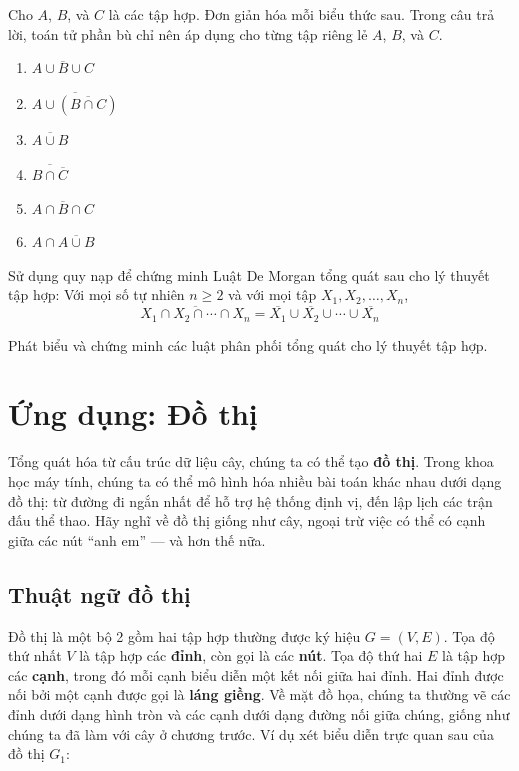 \begin{exercise}
Cho $A$, $B$, và $C$ là các tập hợp. Đơn giản hóa mỗi biểu thức sau. Trong câu trả lời, toán tử phần bù chỉ nên áp dụng cho từng tập riêng lẻ $A$, $B$, và $C$.
\begin{enumerate}[label=\alph*)]
\item $\overline{A \cup B \cup C}$
\item $\overline{A \cup (\overline{B \cap C})}$
\item $\overline{A \cup B}$
\item $\overline{B \cap \overline{C}}$
\item $\overline{A \cap B \cap C}$
\item $A \cap \overline{A \cup B}$
\end{enumerate}
\end{exercise}

\begin{exercise}
Sử dụng quy nạp để chứng minh Luật De Morgan tổng quát sau cho lý thuyết tập hợp: Với mọi số tự nhiên $n \geq 2$ và với mọi tập $X_1, X_2, \ldots, X_n$,
\[
\overline{X_1 \cap X_2 \cap \cdots \cap X_n} = \overline{X_1} \cup \overline{X_2} \cup \cdots \cup \overline{X_n}
\]
\end{exercise}

\begin{exercise}
Phát biểu và chứng minh các luật phân phối tổng quát cho lý thuyết tập hợp.
\end{exercise}


\section{Ứng dụng: Đồ thị}

Tổng quát hóa từ cấu trúc dữ liệu cây, chúng ta có thể tạo \textbf{đồ thị}. Trong khoa học máy tính, chúng ta có thể mô hình hóa nhiều bài toán khác nhau dưới dạng đồ thị: từ đường đi ngắn nhất để hỗ trợ hệ thống định vị, đến lập lịch các trận đấu thể thao. Hãy nghĩ về đồ thị giống như cây, ngoại trừ việc có thể có cạnh giữa các nút ``anh em'' --- và hơn thế nữa.

\subsection{Thuật ngữ đồ thị}

Đồ thị là một bộ 2 gồm hai tập hợp thường được ký hiệu $G = (V, E)$. Tọa độ thứ nhất $V$ là tập hợp các \textbf{đỉnh}, còn gọi là các \textbf{nút}. Tọa độ thứ hai $E$ là tập hợp các \textbf{cạnh}, trong đó mỗi cạnh biểu diễn một kết nối giữa hai đỉnh. Hai đỉnh được nối bởi một cạnh được gọi là \textbf{láng giềng}. Về mặt đồ họa, chúng ta thường vẽ các đỉnh dưới dạng hình tròn và các cạnh dưới dạng đường nối giữa chúng, giống như chúng ta đã làm với cây ở chương trước. Ví dụ xét biểu diễn trực quan sau của đồ thị $G_1$:

